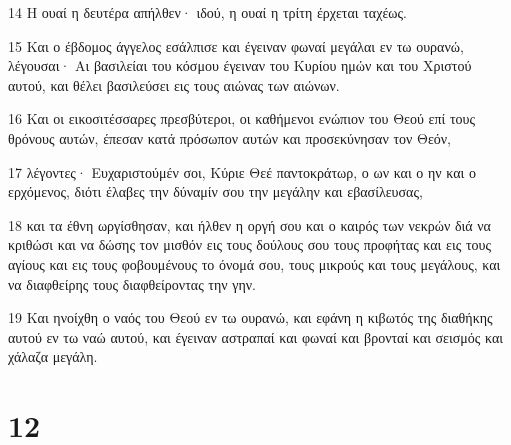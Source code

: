 \par 14 Η ουαί η δευτέρα απήλθεν· ιδού, η ουαί η τρίτη έρχεται ταχέως.
\par 15 Και ο έβδομος άγγελος εσάλπισε και έγειναν φωναί μεγάλαι εν τω ουρανώ, λέγουσαι· Αι βασιλείαι του κόσμου έγειναν του Κυρίου ημών και του Χριστού αυτού, και θέλει βασιλεύσει εις τους αιώνας των αιώνων.
\par 16 Και οι εικοσιτέσσαρες πρεσβύτεροι, οι καθήμενοι ενώπιον του Θεού επί τους θρόνους αυτών, έπεσαν κατά πρόσωπον αυτών και προσεκύνησαν τον Θεόν,
\par 17 λέγοντες· Ευχαριστούμέν σοι, Κύριε Θεέ παντοκράτωρ, ο ων και ο ην και ο ερχόμενος, διότι έλαβες την δύναμίν σου την μεγάλην και εβασίλευσας,
\par 18 και τα έθνη ωργίσθησαν, και ήλθεν η οργή σου και ο καιρός των νεκρών διά να κριθώσι και να δώσης τον μισθόν εις τους δούλους σου τους προφήτας και εις τους αγίους και εις τους φοβουμένους το όνομά σου, τους μικρούς και τους μεγάλους, και να διαφθείρης τους διαφθείροντας την γην.
\par 19 Και ηνοίχθη ο ναός του Θεού εν τω ουρανώ, και εφάνη η κιβωτός της διαθήκης αυτού εν τω ναώ αυτού, και έγειναν αστραπαί και φωναί και βρονταί και σεισμός και χάλαζα μεγάλη.

\chapter{12}

